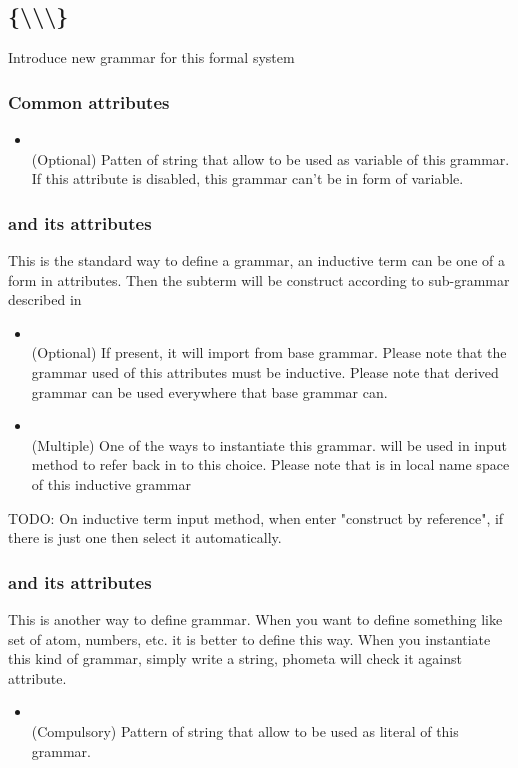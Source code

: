 \subsection{\kGrammar {} \{\kInductive \textbackslash \kLiteral \textbackslash \kSequence \textbackslash \kDictionary\} }
Introduce new grammar for this formal system

\subsubsection{Common attributes}

\begin{itemize}
    \item \kVarRegex {} \\
    (Optional) Patten of string that allow to be used as variable of this grammar. If this attribute is disabled, this grammar can't be in form of variable.
\end{itemize}

\subsubsection{\kInductive and its attributes}
This is the standard way to define a grammar, an inductive term can be one of a form in \kChoice attributes. Then the subterm will be construct according to sub-grammar described in \kChoice
\begin{itemize}
    \item \kExtend {} \\
    (Optional) If present, it will import \kChoice from base grammar. Please note that the grammar used of this attributes must be inductive. Please note that derived grammar can be used everywhere that base grammar can.
    \item \kChoice {} \kRef {} \\
    (Multiple) One of the ways to instantiate this grammar.  will be used in input method to refer back in to this choice. Please note that  is in local name space of this inductive grammar
\end{itemize}

  TODO: On inductive term input method, when enter "construct by reference", if there is just one \kChoice then select it automatically.

\subsubsection{\kLiteral and its attributes}
This is another way to define grammar. When you want to define something like set of atom, numbers, etc. it is better to define this way. When you instantiate this kind of grammar, simply write a string, phometa will check it against \kRegex attribute.
\begin{itemize}
    \item \kRegex {} \\
    (Compulsory) Pattern of string that allow to be used as literal of this grammar.
\end{itemize}

